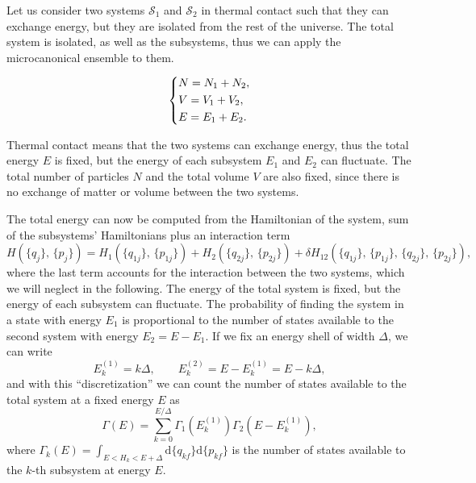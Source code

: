 Let us consider two systems \(\mathcal{S}_1\) and \(\mathcal{S}_2\) in thermal contact such that they can exchange energy, but they are isolated from the rest of the universe. The total system is isolated, as well as the subsystems, thus we can apply the microcanonical ensemble to them.
\begin{figure}[H]
    \begin{minipage}{0.5\textwidth}
        \centering
    \end{minipage}
    \hfill
    \begin{minipage}{0.45\textwidth}
        \[
            \begin{dcases}
                N = N_1 + N_2, \\
                V = V_1 + V_2, \\
                E = E_1 + E_2.
            \end{dcases}
        \]
    \end{minipage}
\end{figure}
Thermal contact means that the two systems can exchange energy, thus the total energy \(E\) is fixed, but the energy of each subsystem \(E_1\) and \(E_2\) can fluctuate. The total number of particles \(N\) and the total volume \(V\) are also fixed, since there is no exchange of matter or volume between the two systems.

The total energy can now be computed from the Hamiltonian of the system, sum of the subsystems' Hamiltonians plus an interaction term
\[
    H(\{q_j\},\,\{p_j\}) = H_1(\{q_{1j}\},\,\{p_{1j}\}) + H_2(\{q_{2j}\},\,\{p_{2j}\}) + \delta H_{12}(\{q_{1j}\},\,\{p_{1j}\},\,\{q_{2j}\},\,\{p_{2j}\}),
\]
where the last term accounts for the interaction between the two systems, which we will neglect in the following. The energy of the total system is fixed, but the energy of each subsystem can fluctuate. The probability of finding the system in a state with energy \(E_1\) is proportional to the number of states available to the second system with energy \(E_2 = E - E_1\). If we fix an energy shell of width \(\Delta\), we can write
\[
    E_k^{(1)} = k \Delta, \qquad E_k^{(2)} = E - E_k^{(1)} = E - k \Delta,
\]
and with this ``discretization'' we can count the number of states available to the total system at a fixed energy \(E\) as
\[
    \Gamma(E) = \sum_{k=0}^{E/\Delta} \Gamma_1(E_k^{(1)}) \Gamma_2(E-E_k^{(1)}),
\]
where \(\Gamma_k(E) = \int_{E < H_k < E + \Delta} \mathrm{d}\{q_{kf}\} \mathrm{d}\{p_{kf}\}\) is the number of states available to the \(k\)-th subsystem at energy \(E\).

